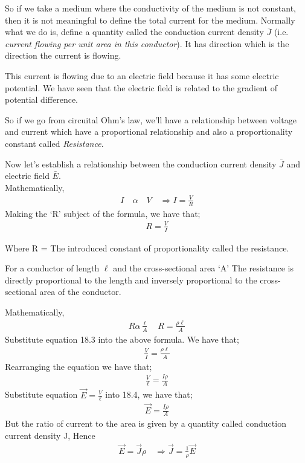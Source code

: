 So if we take a medium where the conductivity of the medium is not constant, then it is not meaningful to define the total current for the medium. Normally what we do is, define a quantity called the conduction current density $ \bar{J} $ (i.e. \emph{current flowing per unit area in this conductor}). It has direction which is the direction the current is flowing. 

This current is flowing due to an electric field because it has some electric potential. We have seen that the electric field is related to the gradient of potential difference.

So if we go from circuital Ohm's law, we'll have a relationship between voltage and current which have a proportional relationship and also a proportionality constant called \emph{Resistance}.

Now let's establish a relationship between the conduction current density $ \bar{J} $ and electric field $ \bar{E} $. \\
Mathematically, 
\begin{align*}
I\quad\alpha\quad V \quad\Rightarrow I = \frac{V}{R}
\end{align*} 
Making the `R' subject of the formula, we have that; 
\begin{align}
R = \frac{V}{I} 
\end{align}
\begin{center}
Where R = The introduced constant of proportionality called the resistance.
\end{center}
For a conductor of length $\ell$ and the cross-sectional area `A' The resistance is directly proportional to the length and inversely proportional to the cross-sectional area of the conductor.

Mathematically, 
\begin{align*}
R \alpha \frac{\ell}{A}\quad R = \frac{\rho\ell}{A}
\end{align*}
Substitute equation 18.3 into the above formula. We have that;
\begin{align*}
\frac{V}{I} = \frac{\rho\ell}{A}
\end{align*}
Rearranging the equation we have that; 
\begin{align}
\frac{V}{\ell} = \frac{I\rho}{A}
\end{align}
Substitute equation $\vec{E} = \frac{V}{\ell}$ into 18.4, we have that;
\begin{align*}
\vec{E} = \frac{I\rho}{A}
\end{align*}
But the ratio of current to the area is given by a quantity called conduction current density J, Hence
\begin{align*}
\vec{E} = \vec{J}\rho \quad \Rightarrow \vec{J}=\frac{1}{\rho}\vec{E}
\end{align*}

